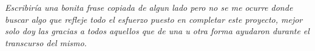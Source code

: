 

\vspace*{\fill}
\begin{changemargin}{5cm}{0.1cm}
{\sf \large \em \raggedleft
Escribiría una bonita frase copiada de algun lado pero no se me ocurre
donde buscar algo que refleje todo el esfuerzo puesto en completar este
proyecto, mejor solo doy las gracias a todos aquellos que de una u otra forma
ayudaron durante el transcurso del mismo.
}
\end{changemargin}
\vspace*{\fill}


\newpage




